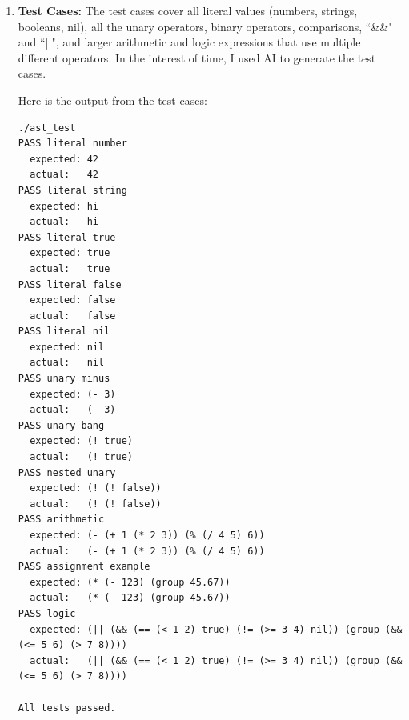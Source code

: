 \documentclass[12pt]{article}
\theoremstyle{definition}
\begin{document}
\begin{enumerate}
            Then you can run the executable:
            \begin{verbatim}
./ast-test
            \end{verbatim}

        \item \textbf{Test Cases:}
            The test cases cover all literal values (numbers, strings, booleans, nil), all the unary operators, binary operators, comparisons, ``\&\&" and ``||", and larger arithmetic and logic expressions that use multiple different operators. In the interest of time, I used AI to generate the test cases.

            Here is the output from the test cases:

            \begin{verbatim}
./ast_test
PASS literal number
  expected: 42
  actual:   42
PASS literal string
  expected: hi
  actual:   hi
PASS literal true
  expected: true
  actual:   true
PASS literal false
  expected: false
  actual:   false
PASS literal nil
  expected: nil
  actual:   nil
PASS unary minus
  expected: (- 3)
  actual:   (- 3)
PASS unary bang
  expected: (! true)
  actual:   (! true)
PASS nested unary
  expected: (! (! false))
  actual:   (! (! false))
PASS arithmetic
  expected: (- (+ 1 (* 2 3)) (% (/ 4 5) 6))
  actual:   (- (+ 1 (* 2 3)) (% (/ 4 5) 6))
PASS assignment example
  expected: (* (- 123) (group 45.67))
  actual:   (* (- 123) (group 45.67))
PASS logic
  expected: (|| (&& (== (< 1 2) true) (!= (>= 3 4) nil)) (group (&& (<= 5 6) (> 7 8))))
  actual:   (|| (&& (== (< 1 2) true) (!= (>= 3 4) nil)) (group (&& (<= 5 6) (> 7 8))))

All tests passed.
            \end{verbatim}
                        

    \end{enumerate}
\end{document}
